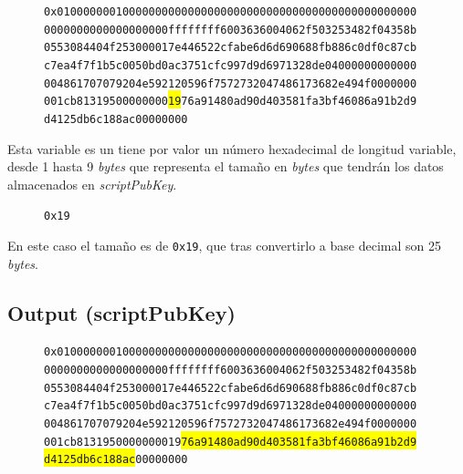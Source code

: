 \documentclass{article}
\begin{document}
    \begin{figure}[H]
        \texttt{0x0100000001000000000000000000000000000000000000000000000} \\
        \texttt{0000000000000000000ffffffff6003636004062f503253482f04358b} \\
        \texttt{0553084404f253000017e446522cfabe6d6d690688fb886c0df0c87cb} \\
        \texttt{c7ea4f7f1b5c0050bd0ac3751cfc997d9d6971328de04000000000000} \\
        \texttt{004861707079204e592120596f7572732047486173682e494f0000000} \\
        \texttt{001cb81319500000000\colorbox{Yellow}{19}76a91480ad90d403581fa3bf46086a91b2d9} \\
        \texttt{d4125db6c188ac00000000}
    \end{figure}
    
    Esta variable es un tiene por valor un número hexadecimal de longitud variable, desde 1 hasta 9 \textit{bytes} que representa el tamaño en \textit{bytes} que tendrán los datos almacenados en \textit{scriptPubKey}.
    \begin{figure}[H]
        \texttt{0x19}
    \end{figure}
    En este caso el tamaño es de \texttt{0x19}, que tras convertirlo a base decimal son 25 \textit{bytes}.
    
    \subsection{Output (scriptPubKey)}
    
    \begin{figure}[H]
        \texttt{0x0100000001000000000000000000000000000000000000000000000} \\
        \texttt{0000000000000000000ffffffff6003636004062f503253482f04358b} \\
        \texttt{0553084404f253000017e446522cfabe6d6d690688fb886c0df0c87cb} \\
        \texttt{c7ea4f7f1b5c0050bd0ac3751cfc997d9d6971328de04000000000000} \\
        \texttt{004861707079204e592120596f7572732047486173682e494f0000000} \\
        \texttt{001cb8131950000000019\colorbox{Yellow}{76a91480ad90d403581fa3bf46086a91b2d9}} \\
        \texttt{\colorbox{Yellow}{d4125db6c188ac}00000000}
    \end{figure}
    
\end{document}
